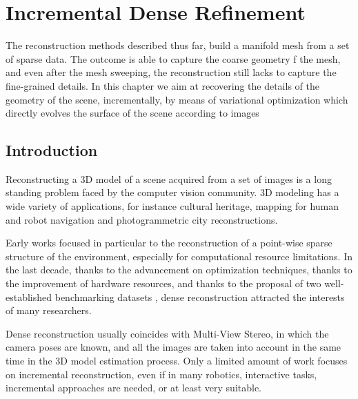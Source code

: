 \chapter{Incremental Dense Refinement}
\label{ch:incrDenseRef}
The reconstruction methods described thus far, build a manifold mesh from a set of sparse data. 
The outcome is able to capture the coarse geometry f the mesh, and even after the mesh sweeping, the reconstruction still lacks to capture the fine-grained details.
In this chapter we aim at recovering the details of the geometry of the scene, incrementally, by means of variational optimization which directly evolves the surface of the scene according to images

\minitoc

\section{Introduction}
Reconstructing a 3D model of a scene acquired from a set of images is a long standing problem faced by the computer vision community. 
3D modeling has a wide variety of applications, for instance cultural heritage, mapping for human and robot navigation and photogrammetric city reconstructions.


Early works focused in particular to the reconstruction of a point-wise sparse structure of the environment, especially for computational resource limitations.
In the last decade, thanks to the advancement on optimization techniques,  thanks to the improvement of hardware resources, and thanks to the proposal of two well-established benchmarking datasets \cite{seitz_et_al06,strecha2008},  dense reconstruction attracted the interests of many researchers.

Dense reconstruction usually coincides with Multi-View Stereo, in which the camera poses are known, and all the images are taken into account in the same time in the 3D model estimation process.
Only a limited amount of work focuses on incremental reconstruction, even if in many robotics, interactive tasks, incremental approaches are needed, or at least very suitable.

